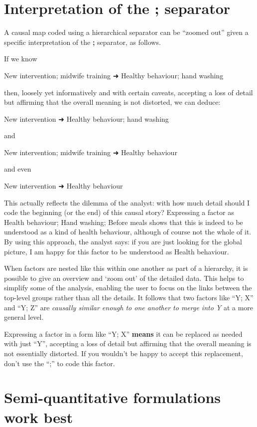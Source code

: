 \documentclass[
]{book}
\begin{document}
\hypertarget{interpretation-of-the-separator}{%
\section{Interpretation of the ; separator}\label{interpretation-of-the-separator}}

A causal map coded using a hierarchical separator can be ``zoomed out'' given a specific interpretation of the \textbf{;} separator, as follows.

If we know

New intervention; midwife training ➜ Healthy behaviour; hand washing

then, loosely yet informatively and with certain caveats, accepting a loss of detail but affirming that the overall meaning is not distorted, we can deduce:

New intervention ➜ Healthy behaviour; hand washing

and

New intervention; midwife training ➜ Healthy behaviour

and even

New intervention ➜ Healthy behaviour

This actually reflects the dilemma of the analyst: with how much detail should I code the beginning (or the end) of this causal story? Expressing a factor as Health behaviour; Hand washing; Before meals shows that this is indeed to be understood as a kind of health behaviour, although of course not the whole of it. By using this approach, the analyst says: if you are just looking for the global picture, I am happy for this factor to be understood as Health behaviour.

When factors are nested like this within one another as part of a hierarchy, it is possible to give an overview and `zoom out' of the detailed data. This helps to simplify some of the analysis, enabling the user to focus on the links between the top-level groups rather than all the details. It follows that two factors like ``Y; X'' and ``Y; Z'' are \emph{causally similar enough to one another to merge into Y} at a more general level.

Expressing a factor in a form like ``Y; X'' \textbf{means} it can be replaced as needed with just ``Y'', accepting a loss of detail but affirming that the overall meaning is not essentially distorted. If you wouldn't be happy to accept this replacement, don't use the ``;'' to code this factor.

\hypertarget{semi-quantitative-formulations-work-best}{%
\section{Semi-quantitative formulations work best}\label{semi-quantitative-formulations-work-best}}
\end{document}
